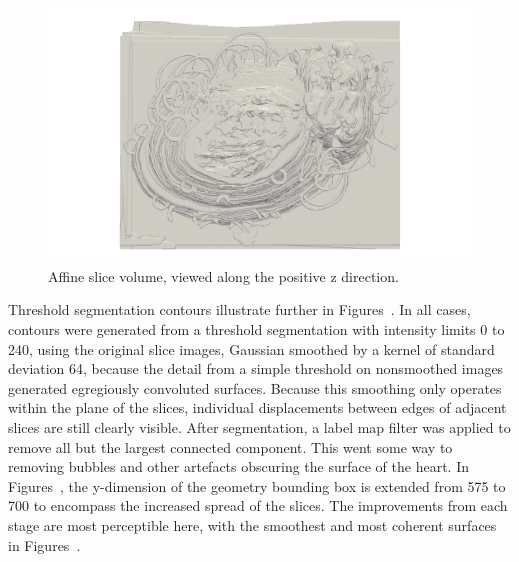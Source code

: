   	\begin{figure}
  	  \centering
  	  \includegraphics[width=0.9\textheight]{Ch6/Figs/Rat28/contours/whole_positive_z_affine}
  	  \caption{Affine slice volume, viewed along the positive z direction.}
  	  \label{fig:positive_z_affine_contour}
  	\end{figure}
	
  	Threshold segmentation contours illustrate further in Figures~. In all cases, contours were generated from a threshold segmentation with intensity limits 0 to 240, using the original slice images, Gaussian smoothed by a kernel of standard deviation 64, because the detail from a simple threshold on nonsmoothed images generated egregiously convoluted surfaces. Because this smoothing only operates within the plane of the slices, individual displacements between edges of adjacent slices are still clearly visible. After segmentation, a label map filter was applied to remove all but the largest connected component. This went some way to removing bubbles and other artefacts obscuring the surface of the heart. In Figures~, the y-dimension of the geometry bounding box is extended from 575 to 700 to encompass the increased spread of the slices. The improvements from each stage are most perceptible here, with the smoothest and most coherent surfaces in Figures~.

